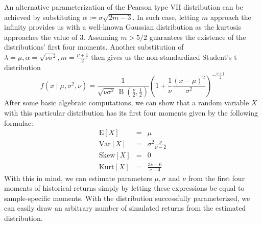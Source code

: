 An alternative parameterization of the Pearson type VII distribution can be achieved by substituting $\alpha := \sigma\sqrt{2m-3}$. In such case, letting $m$ approach the infinity provides us with a well-known Gaussian distribution as the kurtosis approaches the value of 3. Assuming $m>5/2$ guarantees the existence of the distributions' first four moments. Another substitution of $\lambda=\mu, \alpha=\sqrt{\nu\sigma^2}, m=\frac{\nu+1}{2}$ then gives us the non-standardized Student's t distribution
\begin{equation}
f(x\mid \mu ,\sigma ^{2},\nu )={\frac {1}{{\sqrt {\nu \sigma ^{2}}}\,\operatorname {\mathrm {B} } \left({\frac {\nu }{2}},{\frac {1}{2}}\right)}}\left(1+{\frac {1}{\nu }}{\frac {(x-\mu )^{2}}{\sigma ^{2}}}\right)^{-{\frac {\nu +1}{2}}}
\end{equation}
After some basic algebraic computations, we can show that a random variable $X$ with this particular distribution has its first four moments given by the following formulae:
\begin{eqnarray}
	\text{E}[X] &=& \mu \\ 
	\text{Var}[X] &=& \sigma^2\frac{\nu}{\nu-2} \\
	\text{Skew}[X] &=& 0 \\
	\text{Kurt}[X] &=& \frac{3\nu-6}{\nu-4}
\end{eqnarray}
With this in mind, we can estimate parameters $\mu, \sigma$ and $\nu$ from the first four moments of historical returns simply by letting these expressions be equal to sample-specific moments. With the distribution successfully parameterized, we can easily draw an arbitrary number of simulated returns from the estimated distribution.


